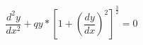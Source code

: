 \begin{equation}
  \frac{d^2y}{dx^2} + qy * [1+ (\frac{dy}{dx})^2]^{\frac{3}{2}} = 0
\end{equation}
